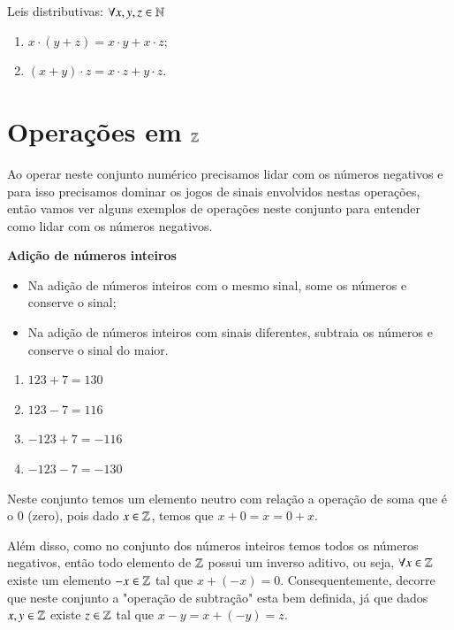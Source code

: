  Leis distributivas: $\forall x, y, z \in \mathbb{N}$
 \begin{enumerate}[1)]
 \item $x \cdot (y + z)= x \cdot y + x \cdot z$;
 \item $(x + y) \cdot z= x \cdot z + y \cdot z$.
 \end{enumerate}

 \section{Operações em \texorpdfstring{$\mathbb{Z}$}{Z}}

 Ao operar neste conjunto numérico precisamos lidar com os números negativos e para isso precisamos dominar os jogos de sinais envolvidos nestas operações, então vamos ver alguns exemplos de operações neste conjunto para entender como lidar com os números negativos.

   \vskip0.3cm
   
 \textbf{Adição de números inteiros}

 \begin{itemize}
  \item Na adição de números inteiros com o mesmo sinal, some os números e conserve o sinal;
  \item Na adição de números inteiros com sinais diferentes, subtraia os números e conserve o sinal do maior.
 \end{itemize}

  \begin{enumerate}[1)]
   \item $123 + 7= 130$
   \item $123 - 7= 116$
   \item $-123 + 7 = -116$
   \item $-123 - 7 = -130$
 \end{enumerate}
 
  Neste conjunto temos um elemento neutro com relação a operação de soma que é o $0$ (zero), pois dado $x \in \mathbb{Z}$, temos que $x+0=x=0+x$.
 
 Além disso, como no conjunto dos números inteiros temos todos os números negativos, então todo elemento de $\mathbb{Z}$ possui um inverso aditivo, ou seja, $\forall x \in \mathbb{Z}$ existe um elemento $-x \in \mathbb{Z}$ tal que $x + (-x)=0$. Consequentemente, decorre que neste conjunto a "operação de subtração" esta bem definida, já que dados $x, y \in \mathbb{Z}$ existe $z \in \mathbb{Z}$ tal que $x - y= x+ (-y)= z$.

   \vskip0.3cm
  
